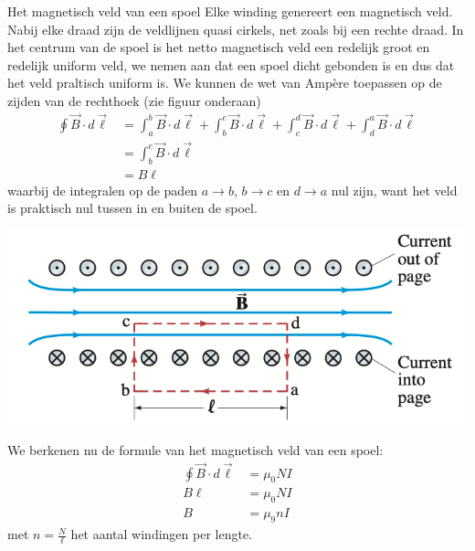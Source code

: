 \begin{theo}{Het magnetisch veld van een spoel}
    \noindent Elke winding genereert een magnetisch veld. Nabij elke draad zijn de veldlijnen quasi cirkels,
    net zoals bij een rechte draad. In het centrum van de spoel is het netto magnetisch veld een redelijk
    groot en redelijk uniform veld, we nemen aan dat een spoel dicht gebonden is en dus dat het veld praltisch uniform is.
    We kunnen de wet van Ampère toepassen op de zijden van de rechthoek (zie figuur onderaan)
    \begin{align*}
        \oint \Vec{B} \cdot d\Vec{\ell} &= \int_{a}^{b} \Vec{B} \cdot d\Vec{\ell} + \int_{b}^{c} \Vec{B} \cdot d\Vec{\ell}
        +  \int_{c}^{d} \Vec{B} \cdot d\Vec{\ell} +  \int_{d}^{a} \Vec{B} \cdot d\Vec{\ell} \\
                                        &= \int_{b}^{c} \Vec{B} \cdot d\Vec{\ell}  \\
                                        &= B\ell
    \end{align*}
    waarbij de integralen op de paden $a \to b$, $b \to c$ en $d \to a$ nul zijn, want het veld is praktisch nul tussen in en buiten de spoel.
    \begin{center}
        \includegraphics[scale = 0.3]{Images/Magnetisme/SpoelMagnetischVeld}
    \end{center}
    We berkenen nu de formule van het magnetisch veld van een spoel:
    \begin{align*}
        \oint \Vec{B} \cdot d\Vec{\ell} &= \mu_{0}NI \\
        B\ell &=  \mu_{0}NI \\
        B &=  \mu_{9}nI
    \end{align*}
    met $n= \tfrac{N}{\ell}$ het aantal windingen per lengte.
\end{theo}

\newpage

